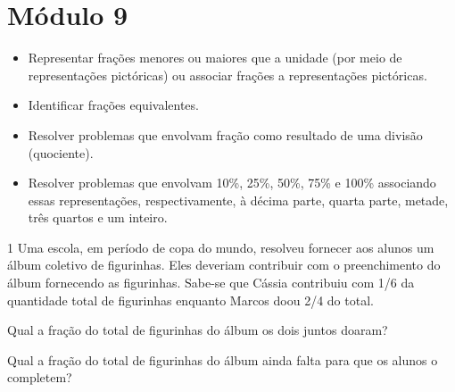 
\chapter{Módulo 9}



\begin{itemize}
\item Representar frações menores ou maiores que a unidade (por meio de
representações pictóricas) ou associar frações a representações pictóricas.

\item Identificar frações equivalentes.

\item Resolver problemas que envolvam fração como resultado de uma divisão
(quociente).

\item Resolver problemas que envolvam 10\%, 25\%, 50\%, 75\% e 100\%
associando essas representações, respectivamente, à décima parte, quarta parte, metade,
três quartos e um inteiro.
\end{itemize}




\num{1} Uma escola, em período de copa do mundo, resolveu fornecer aos
alunos um álbum coletivo de figurinhas. Eles deveriam contribuir com o
preenchimento do álbum fornecendo as figurinhas. Sabe-se que Cássia
contribuiu com 1/6 da quantidade total de figurinhas enquanto Marcos
doou 2/4 do total.

\begin{escolha}
\item
  Qual a fração do total de figurinhas do álbum os dois juntos doaram?


\item
  Qual a fração do total de figurinhas do álbum ainda falta para que os
  alunos o completem?

\end{escolha}

